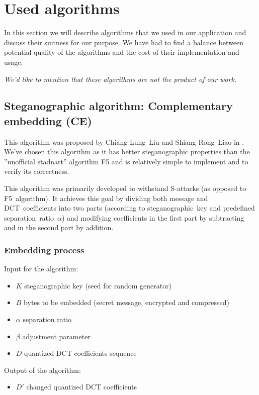\section{Used algorithms}
In this section we will describe algorithms that we used in our application
and discuss their suitness for our purpose. 
We have had to find a balance between potential quality of the algorithms 
and the cost of their implementation and usage.

\textit{We'd like to mention that these algorithms are not the product of our work.}

\subsection{Steganographic algorithm: Complementary embedding (CE)}

This algorithm was proposed by Chiang-Lung~Liu and Shiang-Rong~Liao in \cite{liu2008high}.
We've chosen this algorithm as it has better steganographic properties than the ''unofficial
stadnart'' algorithm F5 and is relatively simple to implement and to verify its correctness.

This algorithm was primarily developed to withstand S-attacks (as opposed to F5~algorithm).
It achieves this goal by dividing both message and DCT~coefficients into two parts
(according to steganographic~key and predefined separation~ratio~$\alpha$) and
modifying coefficients in the first part by subtracting and in the second part by addition.

\subsubsection{Embedding process}
Input for the algorithm:

\begin{itemize}
    \item $K$ steganographic key (seed for random generator)
    \item $B$ bytes to be embedded (secret message, encrypted and compressed)
    \item $\alpha$ separation ratio
    \item $\beta$ adjustment parameter
    \item $D$ quantized DCT coefficients sequence
\end{itemize}

Output of the algorithm:

\begin{itemize}
    \item $D'$ changed quantized DCT coefficients
\end{itemize}

